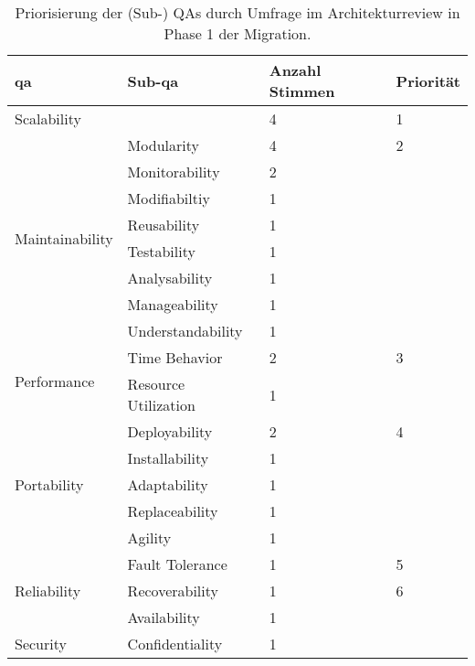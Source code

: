 \begin{table}[!h]
  \centering
  \begin{tabular}{m{2.6cm} m{3.2cm} m{1.3cm} m{1.3cm}}
    \toprule
    \textbf{\gls{qa}} & \textbf{Sub-\gls{qa}} & \textbf{Anzahl Stimmen} & \textbf{Priorität} \\ \midrule
    Scalability & & 4 & 1\\ \hline

    \multirow{8}{=}[-0.1cm]{Maintainability} & Modularity & 4 & 2 \\
    & Monitorability & 2 & \\
    & Modifiabiltiy & 1 &  \\
    & Reusability & 1 &  \\
    & Testability & 1 &  \\
    & Analysability & 1 &  \\
    & Manageability & 1 &  \\
    & Understandability & 1 &  \\ \hline

    \multirow{2}{=}[-0.05cm]{Performance} & Time Behavior & 2 & 3 \\
    & Resource Utilization & 1 &  \\ \hline

   \multirow{5}{=}[-0.1cm]{Portability} & Deployability & 2 & 4 \\
   & Installability & 1 &  \\
   & Adaptability & 1 &  \\
   & Replaceability & 1 &  \\
   & Agility & 1 &  \\ \hline

    \multirow{3}{=}[-0cm]{Reliability} & Fault Tolerance & 1 & 5 \\
    & Recoverability & 1 & 6 \\
    & Availability & 1 &  \\ \hline

    Security & Confidentiality & 1 &  \\
    \bottomrule
  \end{tabular}
  \caption[Priorisierung der (Sub-) QAs durch Umfrage im Architekturreview]{
    Priorisierung der (Sub-) QAs durch Umfrage im Architekturreview in Phase 1 der Migration.
  }
  \label{tab:phase1-qas-priority}
\end{table}
